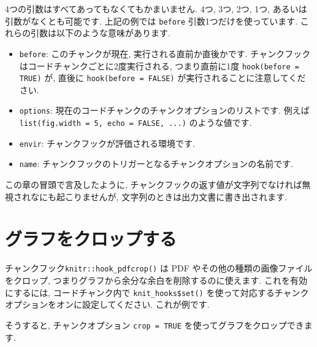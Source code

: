 \documentclass[
  11pt,
  lualatex,ja=standard,jafont=noto]{bxjsreport}
\newenvironment{Shaded}{\begin{snugshade}}{\end{snugshade}}
\newcommand{\AttributeTok}[1]{\textcolor[rgb]{0.77,0.63,0.00}{#1}}
\newcommand{\FunctionTok}[1]{\textcolor[rgb]{0.00,0.00,0.00}{#1}}
\newcommand{\NormalTok}[1]{#1}
\newcommand{\SpecialCharTok}[1]{\textcolor[rgb]{0.00,0.00,0.00}{#1}}
\begin{document}
4つの引数はすべてあってもなくてもかまいません. 4つ, 3つ, 2つ, 1つ, あるいは引数がなくとも可能です. 上記の例では \texttt{before} 引数1つだけを使っています. これらの引数は以下のような意味があります.

\begin{itemize}
\item
  \texttt{before}: このチャンクが現在, 実行される直前か直後かです. チャンクフックはコードチャンクごとに2度実行される, つまり直前に1度 \texttt{hook(before = TRUE)} が, 直後に \texttt{hook(before = FALSE)} が実行されることに注意してください.
\item
  \texttt{options}: 現在のコードチャンクのチャンクオプションのリストです. 例えば \texttt{list(fig.width = 5, echo = FALSE, ...)} のような値です.
\item
  \texttt{envir}: チャンクフックが評価される環境です.
\item
  \texttt{name}: チャンクフックのトリガーとなるチャンクオプションの名前です.
\end{itemize}

この章の冒頭で言及したように, チャンクフックの返す値が文字列でなければ無視されなにも起こりませんが, 文字列のときは出力文書に書き出されます.

\hypertarget{crop-plot}{%
\section{グラフをクロップする}\label{crop-plot}}

チャンクフック\texttt{knitr::hook\_pdfcrop()} は PDF やその他の種類の画像ファイルをクロップ, つまりグラフから余分な余白を削除するのに使えます. これを有効にするには, コードチャンク内で \texttt{knit\_hooks\$set()} を使って対応するチャンクオプションをオンに設定してください. これが例です.

\begin{Shaded}
\end{Shaded}

そうすると, チャンクオプション \texttt{crop = TRUE} を使ってグラフをクロップできます.
\end{document}
